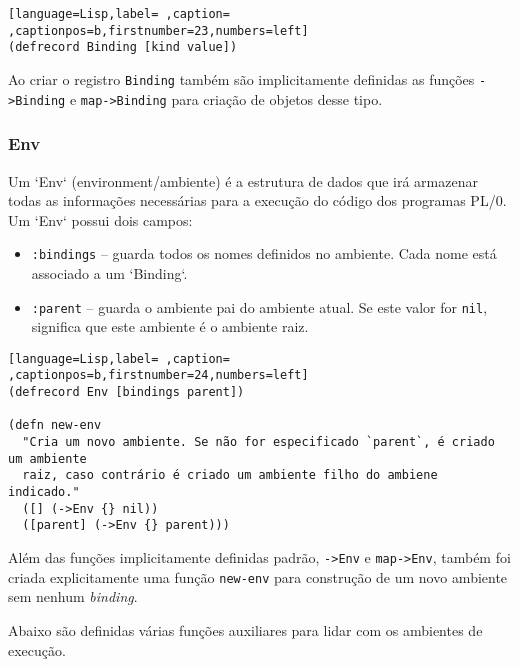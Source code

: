 \documentclass{scrartcl}
\begin{document}
\begin{lstlisting}[language=Lisp,label= ,caption= ,captionpos=b,firstnumber=23,numbers=left]
(defrecord Binding [kind value])
\end{lstlisting}

Ao criar o registro \texttt{Binding} também são implicitamente definidas as funções
\texttt{->Binding} e \texttt{map->Binding} para criação de objetos desse tipo.


\subsubsection{Env}
\label{sec:org51b6d2a}

Um `Env` (environment/ambiente) é a estrutura de dados que irá armazenar
todas as informações necessárias para a execução do código dos programas
PL/0. Um `Env` possui dois campos:
\begin{itemize}
\item \texttt{:bindings} -- guarda todos os nomes definidos no ambiente. Cada nome está
associado a um `Binding`.
\item \texttt{:parent} -- guarda o ambiente pai do ambiente atual. Se este valor for \texttt{nil},
significa que este ambiente é o ambiente raiz.
\end{itemize}


\begin{lstlisting}[language=Lisp,label= ,caption= ,captionpos=b,firstnumber=24,numbers=left]
(defrecord Env [bindings parent])

(defn new-env
  "Cria um novo ambiente. Se não for especificado `parent`, é criado um ambiente
  raiz, caso contrário é criado um ambiente filho do ambiene indicado."
  ([] (->Env {} nil))
  ([parent] (->Env {} parent)))
\end{lstlisting}


Além das funções implicitamente definidas padrão, \texttt{->Env} e \texttt{map->Env}, também
foi criada explicitamente uma função \texttt{new-env} para construção de um novo
ambiente sem nenhum \emph{binding}.

Abaixo são definidas várias funções auxiliares para lidar com os ambientes de
execução.
\end{document}
